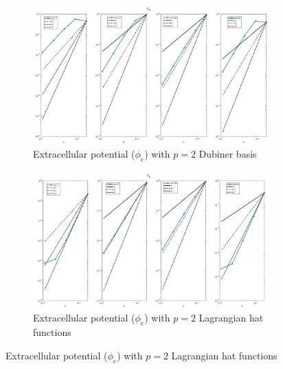 \documentclass[a4paper,11pt]{article}
\begin{document}
\begin{figure}[H]
\caption{Comparison of the extracellular potential ($\phi_e$)}
\label{phie_2}
\begin{subfigure}{\textwidth}
\begin{center}
\includegraphics[width = \textwidth]{./D2_Phie_1.jpg}
\caption{Extracellular potential ($\phi_e$) with $p=2$ Dubiner basis}
\end{center}
\end{subfigure}
\begin{subfigure}{\textwidth}
\begin{center}
\includegraphics[width =\textwidth]{./P2_Phie_1.jpg}
\caption{Extracellular potential ($\phi_e$) with $p=2$ Lagrangian hat functions}
\end{center}
\end{subfigure}
\end{figure}
\newpage
\end{document}
